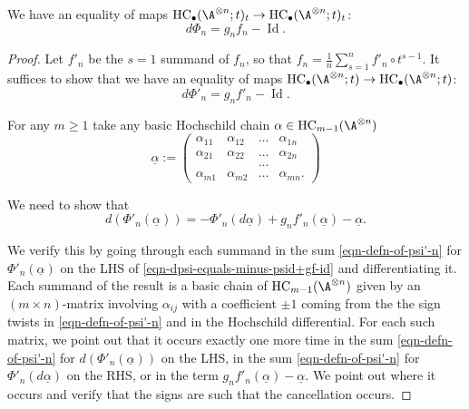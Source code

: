 \documentclass[12pt,a4paper,reqno]{amsart}
\DeclareMathOperator{\id}{Id}
\DeclareMathOperator{\hochcx}{{HC}}
\begin{document}
\begin{theorem}
\label{theorem-phi-is-the-homotopy-of-gf-minus-id}
We have an equality of maps 
$\hochcx_\bullet(\A^{\otimes n}; t)_t 
\rightarrow \hochcx_\bullet(\A^{\otimes n}; t)_t$:
$$ d\Phi_n = g_n f_n - \id. $$
\end{theorem}
\begin{proof}
Let $f'_n$ be the $s = 1$ summand of 
$f_n$, so that $f_n = \frac{1}{n} \sum_{s=1}^n f'_n \circ t^{s-1}$. 
It suffices to show that we have an equality of maps 
$\hochcx_\bullet(\A^{\otimes n}; t) 
\rightarrow \hochcx_\bullet(\A^{\otimes n}; t)$:
$$ d\Phi'_n = g_n f'_n - \id. $$

For any $m \geq 1$ take any basic Hochschild chain 
$\alpha \in \hochcx_{m-1}(\A^{\otimes n})$ 
\begin{equation*}
\underline{\alpha}
:= 
\begin{pmatrix}
\alpha_{11} & \alpha_{12} & \dots & \alpha_{1n}  
\\
\alpha_{21} & \alpha_{22} & \dots & \alpha_{2n}  
\\
& & \dots & 
\\
\alpha_{m1} & \alpha_{m2} & \dots & \alpha_{mn}. 
\end{pmatrix} 
\end{equation*}

We need to show that 
\begin{equation}
\label{eqn-dpsi-equals-minus-psid+gf-id}
d\left(\Phi'_n\left(\underline{\alpha}\right)\right) = 
- \Phi'_n\left(d\underline{\alpha}\right) + g_nf'_n(\underline{\alpha}) - 
\underline{\alpha}. 
\end{equation}

We verify this by going through each summand in 
the sum \eqref{eqn-defn-of-psi'-n} for $\Phi'_n(\underline{\alpha})$ on the LHS
of \eqref{eqn-dpsi-equals-minus-psid+gf-id}
and differentiating it. Each summand of the result 
is a basic chain of $\hochcx_{m-1}(\A^{\otimes n})$ given 
by an $(m \times n)$-matrix involving $\alpha_{ij}$ 
with a coefficient $\pm 1$ coming from the the sign twists in 
\eqref{eqn-defn-of-psi'-n} and in the Hochschild differential. 
For each such matrix, we point
out that it occurs exactly one more time in the
sum \eqref{eqn-defn-of-psi'-n} for $d(\Phi'_n(\underline{\alpha}))$ 
on the LHS, in the sum \eqref{eqn-defn-of-psi'-n} for $\Phi'_n(d
\underline{\alpha})$ on the RHS, 
or in the term $g_nf'_n(\underline{\alpha}) - \underline{\alpha}$. 
We point out where it occurs and verify that the signs are such 
that the cancellation occurs. 


\end{proof}
\end{document}
